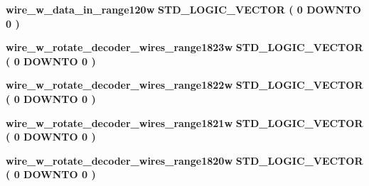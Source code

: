 \begin{DoxyCompactItemize}
\item 
{\bf wire\+\_\+w\+\_\+data\+\_\+in\+\_\+range120w} {\bfseries \textcolor{comment}{S\+T\+D\+\_\+\+L\+O\+G\+I\+C\+\_\+\+V\+E\+C\+T\+OR}\textcolor{vhdlchar}{ }\textcolor{vhdlchar}{(}\textcolor{vhdlchar}{ }\textcolor{vhdlchar}{ } \textcolor{vhdldigit}{0} \textcolor{vhdlchar}{ }\textcolor{keywordflow}{D\+O\+W\+N\+TO}\textcolor{vhdlchar}{ }\textcolor{vhdlchar}{ } \textcolor{vhdldigit}{0} \textcolor{vhdlchar}{ }\textcolor{vhdlchar}{)}\textcolor{vhdlchar}{ }} 
\item 
{\bf wire\+\_\+w\+\_\+rotate\+\_\+decoder\+\_\+wires\+\_\+range1823w} {\bfseries \textcolor{comment}{S\+T\+D\+\_\+\+L\+O\+G\+I\+C\+\_\+\+V\+E\+C\+T\+OR}\textcolor{vhdlchar}{ }\textcolor{vhdlchar}{(}\textcolor{vhdlchar}{ }\textcolor{vhdlchar}{ } \textcolor{vhdldigit}{0} \textcolor{vhdlchar}{ }\textcolor{keywordflow}{D\+O\+W\+N\+TO}\textcolor{vhdlchar}{ }\textcolor{vhdlchar}{ } \textcolor{vhdldigit}{0} \textcolor{vhdlchar}{ }\textcolor{vhdlchar}{)}\textcolor{vhdlchar}{ }} 
\item 
{\bf wire\+\_\+w\+\_\+rotate\+\_\+decoder\+\_\+wires\+\_\+range1822w} {\bfseries \textcolor{comment}{S\+T\+D\+\_\+\+L\+O\+G\+I\+C\+\_\+\+V\+E\+C\+T\+OR}\textcolor{vhdlchar}{ }\textcolor{vhdlchar}{(}\textcolor{vhdlchar}{ }\textcolor{vhdlchar}{ } \textcolor{vhdldigit}{0} \textcolor{vhdlchar}{ }\textcolor{keywordflow}{D\+O\+W\+N\+TO}\textcolor{vhdlchar}{ }\textcolor{vhdlchar}{ } \textcolor{vhdldigit}{0} \textcolor{vhdlchar}{ }\textcolor{vhdlchar}{)}\textcolor{vhdlchar}{ }} 
\item 
{\bf wire\+\_\+w\+\_\+rotate\+\_\+decoder\+\_\+wires\+\_\+range1821w} {\bfseries \textcolor{comment}{S\+T\+D\+\_\+\+L\+O\+G\+I\+C\+\_\+\+V\+E\+C\+T\+OR}\textcolor{vhdlchar}{ }\textcolor{vhdlchar}{(}\textcolor{vhdlchar}{ }\textcolor{vhdlchar}{ } \textcolor{vhdldigit}{0} \textcolor{vhdlchar}{ }\textcolor{keywordflow}{D\+O\+W\+N\+TO}\textcolor{vhdlchar}{ }\textcolor{vhdlchar}{ } \textcolor{vhdldigit}{0} \textcolor{vhdlchar}{ }\textcolor{vhdlchar}{)}\textcolor{vhdlchar}{ }} 
\item 
{\bf wire\+\_\+w\+\_\+rotate\+\_\+decoder\+\_\+wires\+\_\+range1820w} {\bfseries \textcolor{comment}{S\+T\+D\+\_\+\+L\+O\+G\+I\+C\+\_\+\+V\+E\+C\+T\+OR}\textcolor{vhdlchar}{ }\textcolor{vhdlchar}{(}\textcolor{vhdlchar}{ }\textcolor{vhdlchar}{ } \textcolor{vhdldigit}{0} \textcolor{vhdlchar}{ }\textcolor{keywordflow}{D\+O\+W\+N\+TO}\textcolor{vhdlchar}{ }\textcolor{vhdlchar}{ } \textcolor{vhdldigit}{0} \textcolor{vhdlchar}{ }\textcolor{vhdlchar}{)}\textcolor{vhdlchar}{ }} 
\item 

\end{DoxyCompactItemize}
